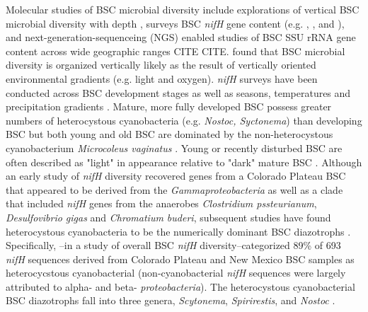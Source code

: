 Molecular studies of BSC microbial diversity include explorations of vertical BSC microbial diversity with depth \cite{Garcia_Pichel_2003}, surveys BSC \textit{nifH} gene content (e.g. \citet{14766579}, \citet{Yeager_2012}, \citet{Yeager} and \citet{Steppe_1996}), and next-generation-sequenceing (NGS) enabled studies of BSC SSU rRNA gene content across wide geographic ranges CITE CITE. \citet{Garcia_Pichel_2003} found that BSC microbial diversity is organized vertically likely as the result of vertically oriented environmental gradients (e.g. light and oxygen). \textit{nifH} surveys have been conducted across BSC development stages \cite{14766579} as well as seasons, temperatures and precipitation gradients \cite{Yeager_2012}. Mature, more fully developed BSC possess greater numbers of heterocystous cyanobacteria (e.g. \textit{Nostoc, Syctonema}) than developing BSC but both young and old BSC are dominated by the non-heterocystous cyanobacterium \textit{Microcoleus vaginatus} \cite{14766579}. Young or recently disturbed BSC are often described as "light" in appearance relative to "dark" mature BSC \cite{Belnap_2002}.  Although an early study of \textit{nifH} diversity recovered genes from a Colorado Plateau BSC that appeared to be derived from the \textit{Gammaproteobacteria} as well as a clade that included \textit{nifH} genes from the anaerobes \textit{Clostridium pssteurianum}, \textit{Desulfovibrio gigas} and \textit{Chromatium buderi}, subsequent studies have found heterocystous cyanobacteria to be the numerically dominant BSC diazotrophs \cite{Yeager, 14766579, Yeager_2012}. Specifically, \citet{Yeager}--in a study of overall BSC \textit{nifH} diversity--categorized 89\% of 693 \textit{nifH} sequences derived from Colorado Plateau and New Mexico BSC samples as heterocycstous cyanobacterial (non-cyanobacterial \textit{nifH} sequences were largely attributed to alpha- and beta- \textit{proteobacteria}). The heterocystous cyanobacterial BSC diazotrophs fall into three genera, \textit{Scytonema}, \textit{Spirirestis}, and \textit{Nostoc} \cite{Yeager, Yeager_2012}.

